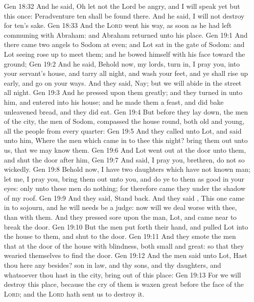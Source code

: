 \vs Gen 18:32 And he said, Oh let not the Lord be angry, and I will speak yet but this once: Peradventure ten shall be found there. And he said, I will not destroy  for ten's sake.
\vs Gen 18:33 And the \textsc{Lord} went his way, as soon as he had left communing with Abraham: and Abraham returned unto his place.
\vs Gen 19:1 And there came two angels to Sodom at even; and Lot sat in the gate of Sodom: and Lot seeing  rose up to meet them; and he bowed himself with his face toward the ground;
\vs Gen 19:2 And he said, Behold now, my lords, turn in, I pray you, into your servant's house, and tarry all night, and wash your feet, and ye shall rise up early, and go on your ways. And they said, Nay; but we will abide in the street all night.
\vs Gen 19:3 And he pressed upon them greatly; and they turned in unto him, and entered into his house; and he made them a feast, and did bake unleavened bread, and they did eat.
\vs Gen 19:4 But before they lay down, the men of the city,  the men of Sodom, compassed the house round, both old and young, all the people from every quarter:
\vs Gen 19:5 And they called unto Lot, and said unto him, Where  the men which came in to thee this night? bring them out unto us, that we may know them.
\vs Gen 19:6 And Lot went out at the door unto them, and shut the door after him,
\vs Gen 19:7 And said, I pray you, brethren, do not so wickedly.
\vs Gen 19:8 Behold now, I have two daughters which have not known man; let me, I pray you, bring them out unto you, and do ye to them as  good in your eyes: only unto these men do nothing; for therefore came they under the shadow of my roof.
\vs Gen 19:9 And they said, Stand back. And they said , This one  came in to sojourn, and he will needs be a judge: now will we deal worse with thee, than with them. And they pressed sore upon the man,  Lot, and came near to break the door.
\vs Gen 19:10 But the men put forth their hand, and pulled Lot into the house to them, and shut to the door.
\vs Gen 19:11 And they smote the men that  at the door of the house with blindness, both small and great: so that they wearied themselves to find the door.
\vs Gen 19:12 And the men said unto Lot, Hast thou here any besides? son in law, and thy sons, and thy daughters, and whatsoever thou hast in the city, bring  out of this place:
\vs Gen 19:13 For we will destroy this place, because the cry of them is waxen great before the face of the \textsc{Lord}; and the \textsc{Lord} hath sent us to destroy it.
